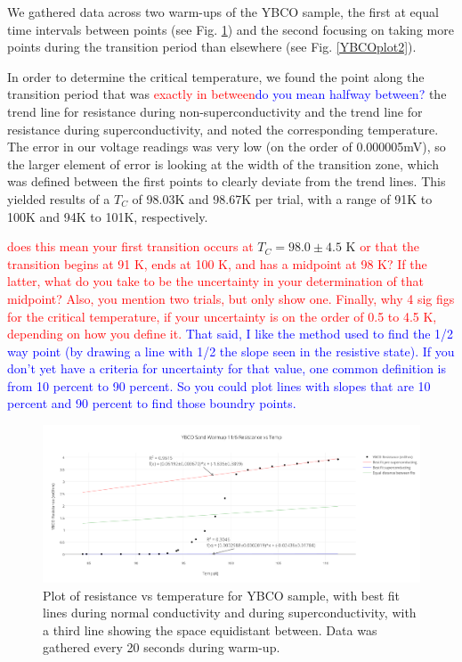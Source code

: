 \documentclass[prb,preprint]{revtex4-1}
\begin{document}
We gathered data across two warm-ups of the YBCO sample, the first at equal time intervals between points (see Fig. \ref{YBCOplot1}) and the second focusing on taking more points during the transition period than elsewhere (see Fig. \ref{YBCOplot2}). 

In order to determine the critical temperature, we found the point along the transition period that was \textcolor{red}{exactly in between}\textcolor{blue}{do you mean halfway between?} the trend line for resistance during non-superconductivity and the trend line for resistance during superconductivity, and noted the corresponding temperature. The error in our voltage readings was very low (on the order of 0.000005mV), so the larger element of error is looking at the width of the transition zone, which was defined between the first points to clearly deviate from the trend lines. This yielded results of a $T_C$ of 98.03K and 98.67K per trial, with a range of 91K to 100K and 94K to 101K, respectively.

\textcolor{red}{does this mean your first transition occurs at }$T_C = 98.0 \pm 4.5 \textrm{ K}$ \textcolor{red}{ or that the transition begins at 91 K, ends at 100 K, and has a midpoint at 98 K? If the latter, what do you take to be the uncertainty in your determination of that midpoint? Also, you mention two trials, but only show one. Finally, why 4 sig figs for the critical temperature, if your uncertainty is on the order of 0.5 to 4.5 K, depending on how you define it. } 
\textcolor{blue}{That said, I like the method used to find the 1/2 way point (by drawing a line with 1/2 the slope seen in the resistive state). If you don't yet have a criteria for uncertainty for that value, one common definition is from 10 percent to 90 percent. So you could plot lines with slopes that are 10 percent and 90 percent to find those boundry points.} 

\begin{figure}[h!]
\centering
\includegraphics[width=7in]{ybco_sand_warmup_116_resistance_vs_temp.png}
\caption{Plot of resistance vs temperature for YBCO sample, with best fit lines during normal conductivity and during superconductivity, with a third line showing the space equidistant between. Data was gathered every 20 seconds during warm-up.}
\label{YBCOplot1}
\end{figure}
\end{document}
